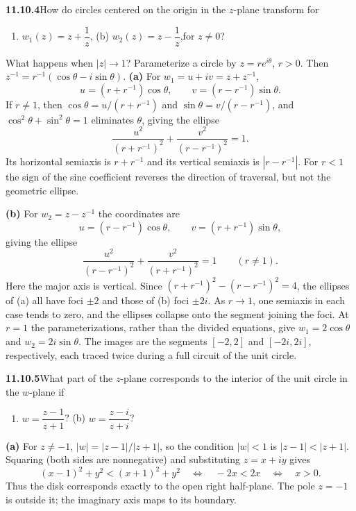 \par\bigskip
\noindent\textbf{11.10.4}\quad How do circles centered on the origin in the
$z$-plane transform for
\begin{enumerate}
\item[(a)] $w_{1}(z)=z+\dfrac{1}{z}$,\quad
(b) $w_{2}(z)=z-\dfrac{1}{z}$,\quad for $z\neq0$?
\end{enumerate}
What happens when $|z|\to1$?
\solution
Parameterize a circle by $z=re^{i\theta}$, $r>0$. Then
$z^{-1}=r^{-1}(\cos\theta-i\sin\theta)$.
\textbf{(a)} For $w_1=u+iv=z+z^{-1}$,
\[
u=(r+r^{-1})\cos\theta,\qquad
v=(r-r^{-1})\sin\theta.
\]
If $r\ne1$, then $\cos\theta=u/(r+r^{-1})$ and
$\sin\theta=v/(r-r^{-1})$, and $\cos^2\theta+\sin^2\theta=1$
eliminates $\theta$, giving the ellipse
\[
\boxed{\frac{u^2}{(r+r^{-1})^2}
+\frac{v^2}{(r-r^{-1})^2}=1}.
\]
Its horizontal semiaxis is $r+r^{-1}$ and its vertical semiaxis
is $|r-r^{-1}|$. For $r<1$ the sign of the sine coefficient
reverses the direction of traversal, but not the geometric ellipse.

\textbf{(b)} For $w_2=z-z^{-1}$ the coordinates are
\[
u=(r-r^{-1})\cos\theta,\qquad
v=(r+r^{-1})\sin\theta,
\]
giving the ellipse
\[
\boxed{\frac{u^2}{(r-r^{-1})^2}
+\frac{v^2}{(r+r^{-1})^2}=1\qquad(r\ne1)}.
\]
Here the major axis is vertical.
Since $(r+r^{-1})^2-(r-r^{-1})^2=4$, the ellipses of (a) all have
foci $\pm2$ and those of (b) foci $\pm2i$.
As $r\to1$, one semiaxis in each case tends to zero, and the ellipses
collapse onto the segment joining the foci.
At $r=1$ the parameterizations, rather than the divided equations,
give $w_1=2\cos\theta$ and $w_2=2i\sin\theta$. The images are
the segments $[-2,2]$ and $[-2i,2i]$, respectively, each traced twice
during a full circuit of the unit circle.

\par\bigskip
\noindent\textbf{11.10.5}\quad What part of the $z$-plane corresponds to the
interior of the unit circle in the $w$-plane if
\begin{enumerate}
\item[(a)] $w=\dfrac{z-1}{z+1}$?\qquad
(b) $w=\dfrac{z-i}{z+i}$?
\end{enumerate}
\solution
\textbf{(a)} For $z\ne-1$, $|w|=|z-1|/|z+1|$, so the condition
$|w|<1$ is $|z-1|<|z+1|$. Squaring (both sides are nonnegative) and
substituting $z=x+iy$ gives
\[
(x-1)^2+y^2<(x+1)^2+y^2
\quad\Longleftrightarrow\quad -2x<2x
\quad\Longleftrightarrow\quad x>0.
\]
Thus the disk corresponds exactly to the open right half-plane.
The pole $z=-1$ is outside it; the imaginary axis maps to its boundary.

